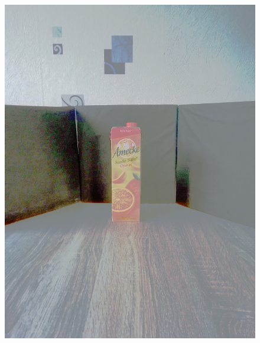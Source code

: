 \documentclass[a4paper,12pt,oneside]{article}
\begin{document}
\begin{figure}[htb]
\begin{minipage}[c]{0.2\textwidth}
\includegraphics[width=\textwidth]{Sources/Bild3_HS.jpg}
\end{minipage}
\hfill
\begin{minipage}[c]{0.08\textwidth}

\end{minipage}
\end{figure}
\end{document}

